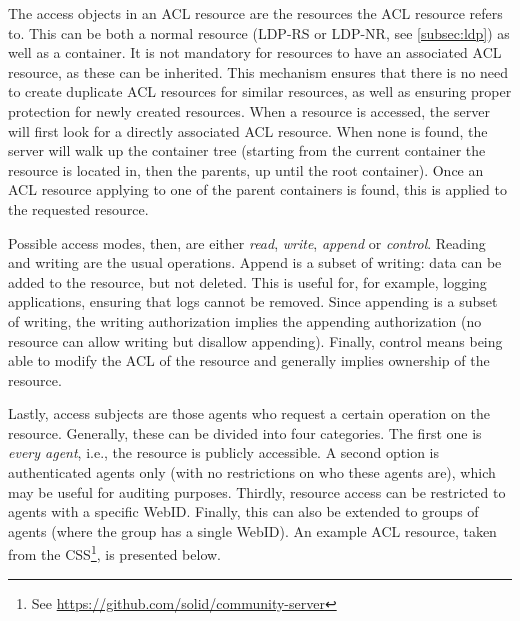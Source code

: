 The access objects in an \gls{ACL} resource are the resources the \gls{ACL} resource refers to. This can be both a normal resource (LDP-RS or LDP-NR, see \ref{subsec:ldp}) as well as a container. It is not mandatory for resources to have an associated \gls{ACL} resource, as these can be inherited. This mechanism ensures that there is no need to create duplicate \gls{ACL} resources for similar resources, as well as ensuring proper protection for newly created resources. When a resource is accessed, the server will first look for a directly associated \gls{ACL} resource. When none is found, the server will walk up the container tree (starting from the current container the resource is located in, then the parents, up until the root container). Once an \gls{ACL} resource applying to one of the parent containers is found, this is applied to the requested resource.

Possible access modes, then, are either \textit{read}, \textit{write}, \textit{append} or \textit{control}. Reading and writing are the usual operations. Append is a subset of writing: data can be added to the resource, but not deleted. This is useful for, for example, logging applications, ensuring that logs cannot be removed. Since appending is a subset of writing, the writing authorization implies the appending authorization (no resource can allow writing but disallow appending). Finally, control means being able to modify the \gls{ACL} of the resource and generally implies ownership of the resource.

Lastly, access subjects are those agents who request a certain operation on the resource. Generally, these can be divided into four categories. The first one is \textit{every agent}, i.e., the resource is publicly accessible. A second option is authenticated agents only (with no restrictions on who these agents are), which may be useful for auditing purposes. Thirdly, resource access can be restricted to agents with a specific WebID. Finally, this can also be extended to groups of agents (where the group has a single WebID). An example \gls{ACL} resource, taken from the \acrlong{CSS}\footnote{See \url{https://github.com/solid/community-server}}, is presented below.

\newpage
{}

